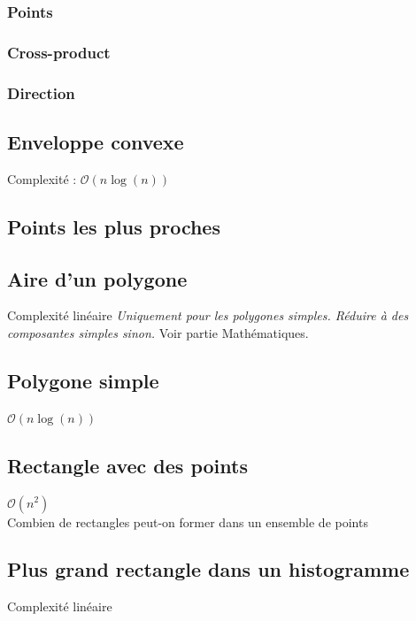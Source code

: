 \documentclass[8pt]{article}
\begin{document}
            \subsubsection{Points}
            {\scriptsize}
            \subsubsection{Cross-product}
            {\scriptsize}
            \subsubsection{Direction}
            {\scriptsize}
        \subsection{Enveloppe convexe}
            Complexité : $\mathcal{O}(n \log(n))$
            {\scriptsize}
        \subsection{Points les plus proches}
            {\scriptsize}
        \subsection{Aire d'un polygone}
        Complexité linéaire
        \textit{Uniquement pour les polygones simples. Réduire à des composantes simples sinon.}
        Voir partie Mathématiques.
        {\scriptsize}
        \subsection{Polygone simple}
        $\mathcal{O}(n\log(n))$
        {\scriptsize}
        \subsection{Rectangle avec des points}
        $\mathcal{O}(n^2)$\\
        Combien de rectangles peut-on former dans un ensemble de points
        {\scriptsize}
        \subsection{Plus grand rectangle dans un histogramme}
        Complexité linéaire
        {\scriptsize}
\end{document}
